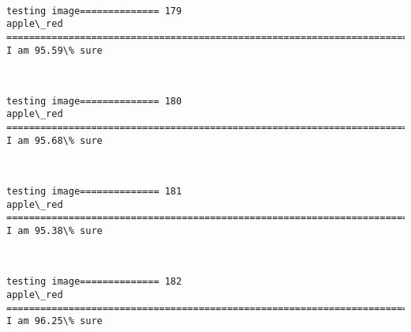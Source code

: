 \documentclass[11pt]{article}
\begin{document}
    \begin{center}
    \end{center}
    { \hspace*{\fill} \\}
    
    \begin{Verbatim}[commandchars=\\\{\}]
testing image============== 179
apple\_red
============================================================================
I am 95.59\% sure

    \end{Verbatim}

    \begin{center}
    \end{center}
    { \hspace*{\fill} \\}
    
    \begin{Verbatim}[commandchars=\\\{\}]
testing image============== 180
apple\_red
============================================================================
I am 95.68\% sure

    \end{Verbatim}

    \begin{center}
    \end{center}
    { \hspace*{\fill} \\}
    
    \begin{Verbatim}[commandchars=\\\{\}]
testing image============== 181
apple\_red
============================================================================
I am 95.38\% sure

    \end{Verbatim}

    \begin{center}
    \end{center}
    { \hspace*{\fill} \\}
    
    \begin{Verbatim}[commandchars=\\\{\}]
testing image============== 182
apple\_red
============================================================================
I am 96.25\% sure

    \end{Verbatim}
\end{document}
